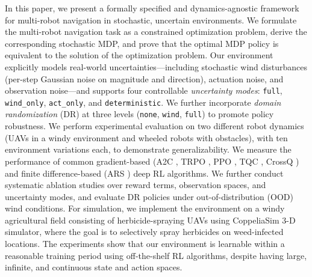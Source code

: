 \documentclass{article}
\begin{document}
In this paper, we present a formally specified and dynamics-agnostic framework for multi-robot navigation in stochastic, uncertain environments. We formulate the multi-robot navigation task as a constrained optimization problem, derive the corresponding stochastic MDP, and prove that the optimal MDP policy is equivalent to the solution of the optimization problem. Our environment explicitly models real-world uncertainties—including stochastic wind disturbances (per-step Gaussian noise on magnitude and direction), actuation noise, and observation noise—and supports four controllable \emph{uncertainty modes}: \texttt{full}, \texttt{wind\_only}, \texttt{act\_only}, and \texttt{deterministic}. We further incorporate \emph{domain randomization} (DR) at three levels (\texttt{none}, \texttt{wind}, \texttt{full}) to promote policy robustness. We perform experimental evaluation on two different robot dynamics (UAVs in a windy environment and wheeled robots with obstacles), with ten environment variations each, to demonstrate generalizability. We measure the performance of common gradient-based (A2C \cite{mnih2016a2c}, TRPO \cite{schulman2015trust}, PPO \cite{schulman2017ppo}, TQC \cite{kuznetsov2020tqc}, CrossQ \cite{bhatt2024crossq}) and finite difference-based (ARS \cite{mania2018ars}) deep RL algorithms. We further conduct systematic ablation studies over reward terms, observation spaces, and uncertainty modes, and evaluate DR policies under out-of-distribution (OOD) wind conditions. For simulation, we implement the environment on a windy agricultural field consisting of herbicide-spraying UAVs using CoppeliaSim \cite{coppeliaSim2013} 3-D simulator, where the goal is to selectively spray herbicides on weed-infected locations. The experiments show that our environment is learnable within a reasonable training period using off-the-shelf RL algorithms, despite having large, infinite, and continuous state and action spaces.
\end{document}
